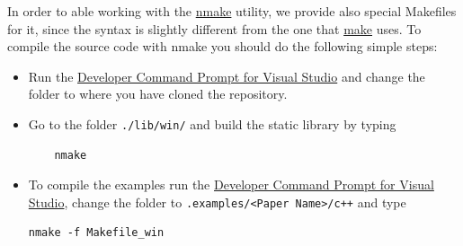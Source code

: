\documentclass[a4wide,11pt]{article}
\renewcommand{\[}{\begin{equation}}
\renewcommand{\]}{\end{equation}}
\renewcommand{\{}{\begin{eqnarray}}
\renewcommand{\}}{\end{eqnarray}}
\begin{document}
In order to able working with the \href{https://msdn.microsoft.com/en-us/library/dd9y37ha.aspx}{nmake} utility, we provide also special Makefiles for it, since the syntax is slightly different from the one that \href{https://www.gnu.org/software/make/}{make} uses. To compile the source code with nmake you should do the following simple steps:
\begin{itemize}
	\item 
	Run the \href{https://msdn.microsoft.com/en-us/library/ms229859(v=vs.110).aspx}{Developer Command Prompt for Visual Studio} and change the folder to where you have cloned the repository.
	\item 
	Go to the folder \texttt{./lib/win/} and build the static library  by typing
	\begin{verbatim}
	nmake
	\end{verbatim}
	\item
	To compile the examples run the \href{https://msdn.microsoft.com/en-us/library/ms229859(v=vs.110).aspx}{Developer Command Prompt for Visual Studio}, change the folder to \texttt{.examples/<Paper Name>/c++} and type
\begin{verbatim}
nmake -f Makefile_win
\end{verbatim}
\end{itemize}
\end{document}
